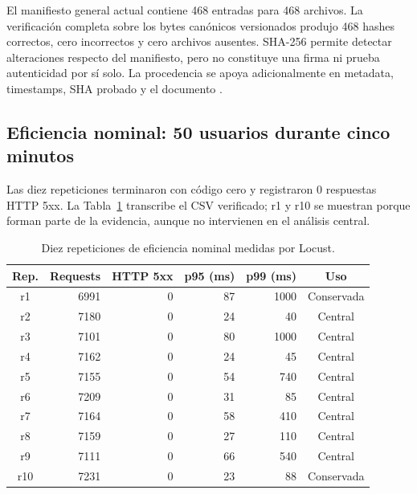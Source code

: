 El manifiesto general actual
 contiene 468 entradas para 468
archivos. La verificación completa sobre los bytes canónicos versionados produjo
468 hashes correctos, cero incorrectos y cero archivos ausentes. SHA-256 permite detectar alteraciones
respecto del manifiesto, pero no constituye una firma ni prueba autenticidad por
sí solo. La procedencia se apoya adicionalmente en metadata, timestamps, SHA
probado y el documento
.

\subsection{Eficiencia nominal: 50 usuarios durante cinco minutos}
\label{subsec:eficiencia-nominal}

Las diez repeticiones terminaron con código cero y registraron 0 respuestas HTTP
5xx. La Tabla~\ref{tab:repeticiones-eficiencia} transcribe el CSV verificado; r1
y r10 se muestran porque forman parte de la evidencia, aunque no intervienen en
el análisis central.

\begin{table}[ht]
  \centering
  \small
  \caption{Diez repeticiones de eficiencia nominal medidas por Locust.}
  \label{tab:repeticiones-eficiencia}
  \begin{tabular}{|c|r|r|r|r|c|}
    \hline
    \textbf{Rep.} & \textbf{Requests} & \textbf{HTTP 5xx} & \textbf{p95 (ms)} & \textbf{p99 (ms)} & \textbf{Uso} \\
    \hline
    r1  & 6991 & 0 & 87 & 1000 & Conservada \\
    r2  & 7180 & 0 & 24 & 40   & Central \\
    r3  & 7101 & 0 & 80 & 1000 & Central \\
    r4  & 7162 & 0 & 24 & 45   & Central \\
    r5  & 7155 & 0 & 54 & 740  & Central \\
    r6  & 7209 & 0 & 31 & 85   & Central \\
    r7  & 7164 & 0 & 58 & 410  & Central \\
    r8  & 7159 & 0 & 27 & 110  & Central \\
    r9  & 7111 & 0 & 66 & 540  & Central \\
    r10 & 7231 & 0 & 23 & 88   & Conservada \\
    \hline
  \end{tabular}
\end{table}

